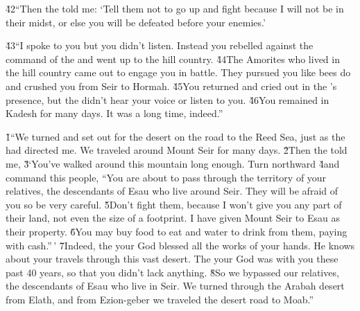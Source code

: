 \v{42}``Then the  told me: `Tell them not to go up and fight because I will not be in their midst, or else you will be defeated before your enemies.'

\v{43}``I spoke to you but you didn't listen. Instead you rebelled against the command of the  and went up to the hill country. \v{44}The Amorites who lived in the hill country came out to engage you in battle. They pursued you like bees do and crushed you from Seir to Hormah. \v{45}You returned and cried out in the 's presence, but the  didn't hear your voice or listen to you. \v{46}You remained in Kadesh for many days. It was a long time, indeed.''

\v{1}``We turned and set out for the desert on the road to the Reed Sea, just as the  had directed me. We traveled around Mount Seir for many days. \v{2}Then the  told me, \v{3}`You've walked around this mountain long enough. Turn northward \v{4}and command this people, ``You are about to pass through the territory of your relatives, the descendants of Esau who live around Seir. They will be afraid of you so be very careful. \v{5}Don't fight them, because I won't give you any part of their land, not even the size of a footprint. I have given Mount Seir to Esau as their property. \v{6}You may buy food to eat and water to drink from them, paying with cash.''\,' \v{7}Indeed, the  your God blessed all the works of your hands. He knows about your travels through this vast desert. The  your God was with you these past 40 years, so that you didn't lack anything. \v{8}So we bypassed our relatives, the descendants of Esau who live in Seir. We turned through the Arabah desert from Elath, and from Ezion-geber we traveled the desert road to Moab.''

